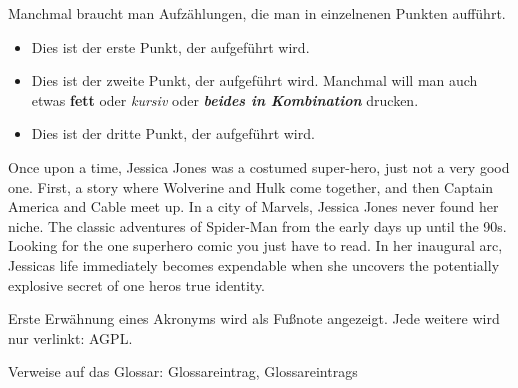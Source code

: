 Manchmal braucht man Aufzählungen, die man in einzelnenen Punkten aufführt.
\begin{itemize}
\item Dies ist der erste Punkt, der aufgeführt wird.
\item Dies ist der zweite Punkt, der aufgeführt wird. Manchmal will man auch etwas \textbf{fett} oder \textit{kursiv} oder \textbf{\textit{beides in Kombination}}  drucken.
\item Dies ist der dritte Punkt, der aufgeführt wird.
\end{itemize}

Once upon a time, Jessica Jones was a costumed super-hero, just not a very good one. First, a story where Wolverine and Hulk come together, and then Captain America and Cable meet up. In a city of Marvels, Jessica Jones never found her niche. The classic adventures of Spider-Man from the early days up until the 90s. Looking for the one superhero comic you just have to read. In her inaugural arc, Jessicas life immediately becomes expendable when she uncovers the potentially explosive secret of one heros true identity.

Erste Erwähnung eines Akronyms wird als Fußnote angezeigt. Jede weitere wird
nur verlinkt: \acf{AGPL}. \cite{fsf:2007}

Verweise auf das Glossar: \gls{Glossareintrag}, \glspl{Glossareintrag}

